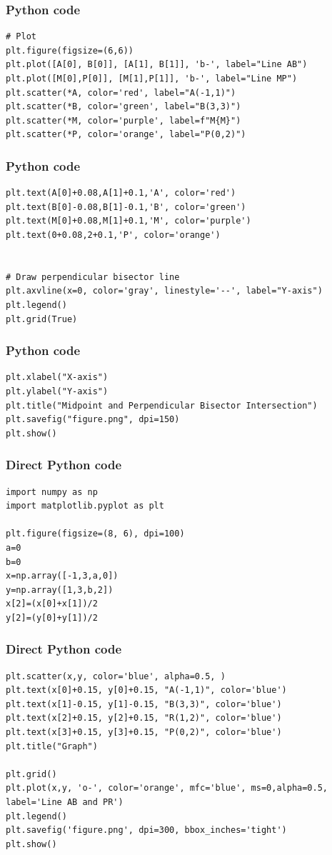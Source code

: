 \documentclass{beamer}
\begin{document}
\begin{frame}[fragile]
\frametitle{Python code}
\begin{lstlisting}
# Plot
plt.figure(figsize=(6,6))
plt.plot([A[0], B[0]], [A[1], B[1]], 'b-', label="Line AB")
plt.plot([M[0],P[0]], [M[1],P[1]], 'b-', label="Line MP")
plt.scatter(*A, color='red', label="A(-1,1)")
plt.scatter(*B, color='green', label="B(3,3)")
plt.scatter(*M, color='purple', label=f"M{M}")
plt.scatter(*P, color='orange', label="P(0,2)")
\end{lstlisting}
\end{frame}
\begin{frame}[fragile]
\frametitle{Python code}
\begin{lstlisting}
plt.text(A[0]+0.08,A[1]+0.1,'A', color='red')
plt.text(B[0]-0.08,B[1]-0.1,'B', color='green')
plt.text(M[0]+0.08,M[1]+0.1,'M', color='purple')
plt.text(0+0.08,2+0.1,'P', color='orange')


# Draw perpendicular bisector line
plt.axvline(x=0, color='gray', linestyle='--', label="Y-axis")
plt.legend()
plt.grid(True)
\end{lstlisting}
\end{frame}
\begin{frame}[fragile]
\frametitle{Python code}
\begin{lstlisting}
plt.xlabel("X-axis")
plt.ylabel("Y-axis")
plt.title("Midpoint and Perpendicular Bisector Intersection")
plt.savefig("figure.png", dpi=150)
plt.show()
\end{lstlisting}
\end{frame}
\begin{frame}[fragile]
\frametitle{Direct Python code}
\begin{lstlisting}
import numpy as np
import matplotlib.pyplot as plt

plt.figure(figsize=(8, 6), dpi=100)
a=0
b=0
x=np.array([-1,3,a,0])
y=np.array([1,3,b,2])
x[2]=(x[0]+x[1])/2
y[2]=(y[0]+y[1])/2
\end{lstlisting}
\end{frame}
\begin{frame}[fragile]
\frametitle{Direct Python code}
\begin{lstlisting}
plt.scatter(x,y, color='blue', alpha=0.5, )
plt.text(x[0]+0.15, y[0]+0.15, "A(-1,1)", color='blue')
plt.text(x[1]-0.15, y[1]-0.15, "B(3,3)", color='blue')
plt.text(x[2]+0.15, y[2]+0.15, "R(1,2)", color='blue')
plt.text(x[3]+0.15, y[3]+0.15, "P(0,2)", color='blue')
plt.title("Graph")

plt.grid()
plt.plot(x,y, 'o-', color='orange', mfc='blue', ms=0,alpha=0.5, label='Line AB and PR')
plt.legend()
plt.savefig('figure.png', dpi=300, bbox_inches='tight')
plt.show()
\end{lstlisting}
\end{frame}
\end{document}
